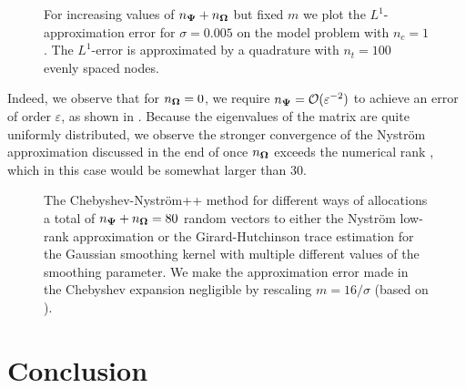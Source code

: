\documentclass[12pt]{article}
\begin{document}
\begin{figure}[ht]
    \centering
    
    \caption{For increasing values of $n_{\boldsymbol{\Psi}} + n_{\boldsymbol{\Omega}}$ but fixed $m$ we plot the $L^1$-approximation error for $\sigma=0.005$ on the model problem with $n_c = 1$. The $L^1$-error is approximated by a quadrature with $n_t = 100$ evenly spaced nodes.}
    \label{fig:convergence}
\end{figure}

Indeed, we observe that for $n_{\boldsymbol{\Omega}} = 0$, we require $n_{\boldsymbol{\Psi}} = \mathcal{O}(\varepsilon^{-2})$ to achieve an error of order $\varepsilon$, as shown in . Because the eigenvalues of the matrix are quite uniformly distributed, we observe the stronger convergence of the Nyström approximation discussed in the end of  once $n_{\boldsymbol{\Omega}}$ exceeds the numerical rank , which in this case would be somewhat larger than $30$.

\begin{figure}[ht]
    \centering
    
    \caption{The Chebyshev-Nyström++ method for different ways of allocations a total of $n_{\boldsymbol{\Psi}} + n_{\boldsymbol{\Omega}}=80$ random vectors to either the Nystr\"om low-rank approximation or the Girard-Hutchinson trace estimation for the Gaussian smoothing kernel with multiple different values of the smoothing parameter. We make the approximation error made in the Chebyshev expansion negligible by rescaling $m=16 / \sigma$ (based on ).}
    \label{fig:distribution}
\end{figure}




\clearpage
\section{Conclusion}
\label{sec:conclusion}

\end{document}
